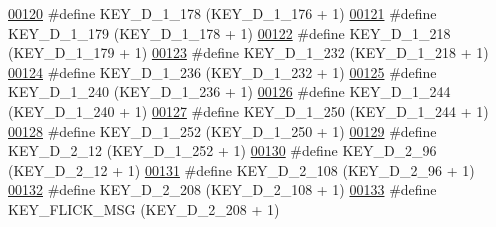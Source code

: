 \begin{DoxyCode}
\hypertarget{dmp_key_8h_source.tex_l00120}{}\hyperlink{dmp_key_8h_a24dd0fa1bca546b44417d8437e16aa00}{00120} \textcolor{preprocessor}{#define KEY\_D\_1\_178                 (KEY\_D\_1\_176 + 1)}
\hypertarget{dmp_key_8h_source.tex_l00121}{}\hyperlink{dmp_key_8h_a30bbe5e12b3c138038fee0807af3a9ca}{00121} \textcolor{preprocessor}{#define KEY\_D\_1\_179                 (KEY\_D\_1\_178 + 1)}
\hypertarget{dmp_key_8h_source.tex_l00122}{}\hyperlink{dmp_key_8h_a194231f69c028b220d737062f0ccbe75}{00122} \textcolor{preprocessor}{#define KEY\_D\_1\_218                 (KEY\_D\_1\_179 + 1)}
\hypertarget{dmp_key_8h_source.tex_l00123}{}\hyperlink{dmp_key_8h_af87debf46120ddd419f199bd5e16cf19}{00123} \textcolor{preprocessor}{#define KEY\_D\_1\_232                 (KEY\_D\_1\_218 + 1)}
\hypertarget{dmp_key_8h_source.tex_l00124}{}\hyperlink{dmp_key_8h_ab6c43f0cc8475834e7e5d6e728da7bb2}{00124} \textcolor{preprocessor}{#define KEY\_D\_1\_236                 (KEY\_D\_1\_232 + 1)}
\hypertarget{dmp_key_8h_source.tex_l00125}{}\hyperlink{dmp_key_8h_a383c41677cba7f92439593b54348ce76}{00125} \textcolor{preprocessor}{#define KEY\_D\_1\_240                 (KEY\_D\_1\_236 + 1)}
\hypertarget{dmp_key_8h_source.tex_l00126}{}\hyperlink{dmp_key_8h_afc87225098310289bbe1fec4f1f65dcf}{00126} \textcolor{preprocessor}{#define KEY\_D\_1\_244                 (KEY\_D\_1\_240 + 1)}
\hypertarget{dmp_key_8h_source.tex_l00127}{}\hyperlink{dmp_key_8h_a99b10aa6e7b2ac6eb9aebabf938a7532}{00127} \textcolor{preprocessor}{#define KEY\_D\_1\_250                 (KEY\_D\_1\_244 + 1)}
\hypertarget{dmp_key_8h_source.tex_l00128}{}\hyperlink{dmp_key_8h_a211af07d226946ad2c16ee2cb3875056}{00128} \textcolor{preprocessor}{#define KEY\_D\_1\_252                 (KEY\_D\_1\_250 + 1)}
\hypertarget{dmp_key_8h_source.tex_l00129}{}\hyperlink{dmp_key_8h_a1b907f168ae88396be0f6020bd1a9c16}{00129} \textcolor{preprocessor}{#define KEY\_D\_2\_12                  (KEY\_D\_1\_252 + 1)}
\hypertarget{dmp_key_8h_source.tex_l00130}{}\hyperlink{dmp_key_8h_a12b601807e4469fd558c90b14cbca8a8}{00130} \textcolor{preprocessor}{#define KEY\_D\_2\_96                  (KEY\_D\_2\_12 + 1)}
\hypertarget{dmp_key_8h_source.tex_l00131}{}\hyperlink{dmp_key_8h_add19d31a65a00b17e9551c5bc5059793}{00131} \textcolor{preprocessor}{#define KEY\_D\_2\_108                 (KEY\_D\_2\_96 + 1)}
\hypertarget{dmp_key_8h_source.tex_l00132}{}\hyperlink{dmp_key_8h_ab33e81a3e1768a6fa5e153cd30a7196a}{00132} \textcolor{preprocessor}{#define KEY\_D\_2\_208                 (KEY\_D\_2\_108 + 1)}
\hypertarget{dmp_key_8h_source.tex_l00133}{}\hyperlink{dmp_key_8h_a4e087dbe9371b396ec1db7f3162cfecc}{00133} \textcolor{preprocessor}{#define KEY\_FLICK\_MSG               (KEY\_D\_2\_208 + 1)}

\end{DoxyCode}
